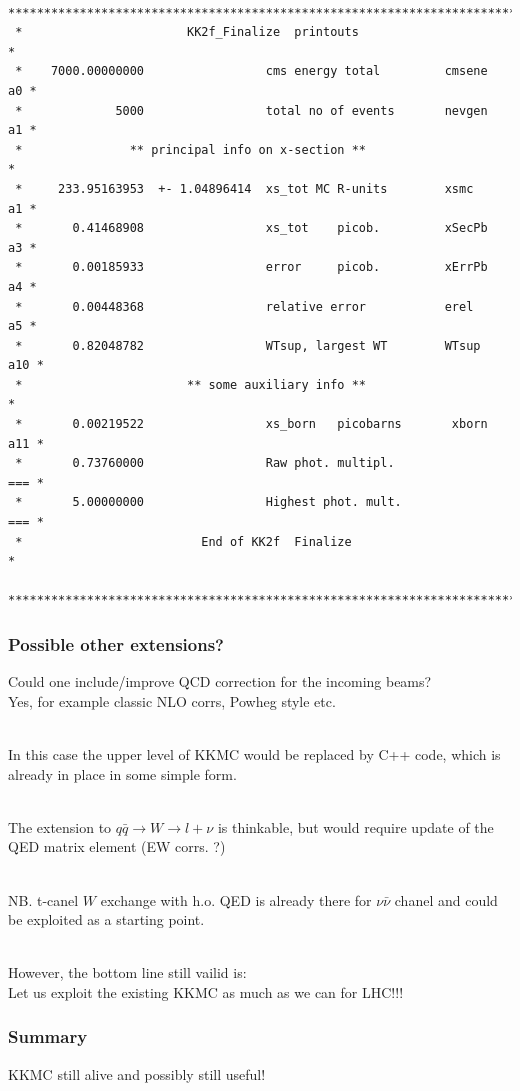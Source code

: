 \documentclass{beamer}
\begin{document}
\begin{frame}[fragile]
{\begin{verbatim}
 ***************************************************************************
 *                       KK2f_Finalize  printouts                          *
 *    7000.00000000                 cms energy total         cmsene     a0 *
 *             5000                 total no of events       nevgen     a1 *
 *               ** principal info on x-section **                         *
 *     233.95163953  +- 1.04896414  xs_tot MC R-units        xsmc       a1 *
 *       0.41468908                 xs_tot    picob.         xSecPb     a3 *
 *       0.00185933                 error     picob.         xErrPb     a4 *
 *       0.00448368                 relative error           erel       a5 *
 *       0.82048782                 WTsup, largest WT        WTsup     a10 *
 *                       ** some auxiliary info **                         *
 *       0.00219522                 xs_born   picobarns       xborn    a11 *
 *       0.73760000                 Raw phot. multipl.                 === *
 *       5.00000000                 Highest phot. mult.                === *
 *                         End of KK2f  Finalize                           *
 ***************************************************************************

\end{verbatim}
}%
\end{frame}


\begin{frame}[fragile]
\frametitle{\bf Possible other extensions?}

\small
Could one include/improve
QCD correction for the incoming beams?\\
Yes, for example classic NLO corrs, Powheg style etc.

~~~\\
In this case the upper level of KKMC would be replaced by C++ code,
which is already in place in some simple form.

~~~\\
The extension to $q\bar{q} \to W \to l+\nu$ is thinkable,
but would require update of the QED matrix element (EW corrs. ?)

~~~\\
NB. t-canel $W$ exchange with h.o. QED
is already there for $\nu\bar\nu$ chanel and could be exploited
as a starting point.

~~~\\
However, the bottom line still vailid is:\\
Let us exploit the existing KKMC as much as we can for LHC!!!
\end{frame}



\begin{frame}[fragile]
\frametitle{\bf\LARGE Summary}

\Huge
KKMC still alive and possibly still useful!

\end{frame}
\end{document}
